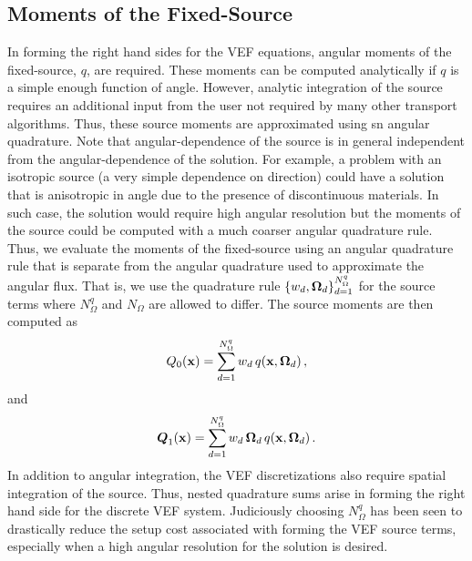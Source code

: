 \documentclass[../doc.tex]{subfiles}
\begin{document}
\subsection{Moments of the Fixed-Source}
In forming the right hand sides for the VEF equations, angular moments of the fixed-source, $q$, are required. These moments can be computed analytically if $q$ is a simple enough function of angle. However, analytic integration of the source requires an additional input from the user not required by many other transport algorithms. Thus, these source moments are approximated using \gls{sn} angular quadrature. Note that angular-dependence of the source is in general independent from the angular-dependence of the solution. For example, a problem with an isotropic source (a very simple dependence on direction) could have a solution that is anisotropic in angle due to the presence of discontinuous materials. In such case, the solution would require high angular resolution but the moments of the source could be computed with a much coarser angular quadrature rule. Thus, we evaluate the moments of the fixed-source using an angular quadrature rule that is separate from the angular quadrature used to approximate the angular flux. That is, we use the quadrature rule $\{w_d,\boldsymbol{\Omega}_d\}_{d=1}^{N_\Omega^q}$ for the source terms where $N_\Omega^q$ and $N_\Omega$ are allowed to differ. The source moments are then computed as 
	\begin{equation}
		Q_0(\boldsymbol{\mathrm{x}}) = \sum_{d=1}^{N_\Omega^q} w_d\, q(\boldsymbol{\mathrm{x}},\boldsymbol{\Omega}_d) \,,
	\end{equation}
and 
	\begin{equation}
		\boldsymbol{Q}_1(\boldsymbol{\mathrm{x}}) = \sum_{d=1}^{N_\Omega^q} w_d\,\boldsymbol{\Omega}_d\,q(\boldsymbol{\mathrm{x}},\boldsymbol{\Omega}_d) \,. 
	\end{equation}
In addition to angular integration, the VEF discretizations also require spatial integration of the source. Thus, nested quadrature sums arise in forming the right hand side for the discrete VEF system. Judiciously choosing $N_\Omega^q$ has been seen to drastically reduce the setup cost associated with forming the VEF source terms, especially when a high angular resolution for the solution is desired. 
\end{document}

